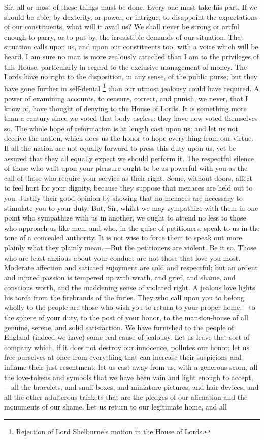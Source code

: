 Sir, all or most of these things must be done. Every one must take his part. If we should be able, by dexterity, or power, or intrigue, to disappoint the expectations of our constituents, what will it avail us? We shall never be strong or artful enough to parry, or to put by, the irresistible demands of our situation. That situation calls upon us, and upon our constituents too, with a voice which will be heard. I am sure no man is more zealously attached than I am to the privileges of this House, particularly in regard to the exclusive management of money. The Lords have no right to the disposition, in any sense, of the public purse; but they have gone further in self-denial 
\footnote{ Rejection of Lord Shelburne's motion in the House of Lords.}
 than our utmost jealousy could have required. A power of examining accounts, to censure, correct, and punish, we never, that I know of, have thought of denying to the House of Lords. It is something more than a century since we voted that body useless: they have now voted themselves so. The whole hope of reformation is at length cast upon us; and let us not deceive the nation, which does us the honor to hope everything from our virtue. If all the nation are not equally forward to press this duty upon us, yet be assured that they all equally expect we should perform it. The respectful silence of those who wait upon your pleasure ought to be as powerful with you as the call of those who require your service as their right. Some, without doors, affect to feel hurt for your dignity, because they suppose that menaces are held out to you. Justify their good opinion by showing that no menaces are necessary to stimulate you to your duty. But, Sir, whilst we may sympathize with them in one point who sympathize with us in another, we ought to attend no less to those who approach us like men, and who, in the guise of petitioners, speak to us in the tone of a concealed authority. It is not wise to force them to speak out more plainly what they plainly mean.—But the petitioners are violent. Be it so. Those who are least anxious about your conduct are not those that love you most. Moderate affection and satiated enjoyment are cold and respectful; but an ardent and injured passion is tempered up with wrath, and grief, and shame, and conscious worth, and the maddening sense of violated right. A jealous love lights his torch from the firebrands of the furies. They who call upon you to belong wholly to the people are those who wish you to return to your proper home,—to the sphere of your duty, to the post of your honor, to the mansion-house of all genuine, serene, and solid satisfaction. We have furnished to the people of England (indeed we have) some real cause of jealousy. Let us leave that sort of company which, if it does not destroy our innocence, pollutes our honor; let us free ourselves at once from everything that can increase their suspicions and inflame their just resentment; let us cast away from us, with a generous scorn, all the love-tokens and symbols that we have been vain and light enough to accept,—all the bracelets, and snuff-boxes, and miniature pictures, and hair devices, and all the other adulterous trinkets that are the pledges of our alienation and the monuments of our shame. Let us return to our legitimate home, and all 